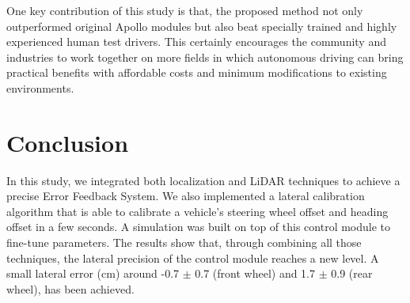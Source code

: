 \documentclass[letterpaper, 10 pt, conference]{ieeeconf}
\begin{document}
One key contribution of this study is that, the proposed method not only outperformed
original Apollo modules but also beat specially trained and highly experienced human test
drivers. This certainly encourages the community and industries to work together on more
fields in which autonomous driving can bring practical benefits with affordable costs and
minimum modifications to existing environments.

\section{Conclusion} \label{sec:conclusion}
In this study, we integrated both localization and LiDAR techniques to achieve a precise Error Feedback System. We also implemented a lateral calibration algorithm that is able to calibrate a vehicle's steering wheel offset and heading offset in a few seconds. A simulation was built on top of this control module to fine-tune parameters. The results show that, through combining all those techniques, the lateral precision of the control module reaches a new level.
A small lateral error (cm) around -0.7 $\pm$ 0.7 (front wheel) and 1.7 $\pm$ 0.9 (rear wheel), has been achieved. 







\end{document}
